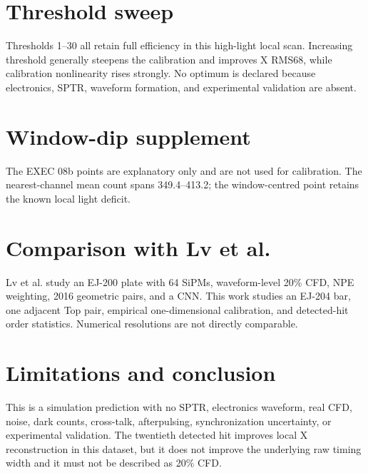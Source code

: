 \documentclass{article}
\begin{document}
\section{Threshold sweep}
Thresholds 1--30 all retain full efficiency in this high-light local scan.
Increasing threshold generally steepens the calibration and improves X RMS68,
while calibration nonlinearity rises strongly. No optimum is declared because
electronics, SPTR, waveform formation, and experimental validation are absent.
\section{Window-dip supplement}
The EXEC 08b points are explanatory only and are not used for calibration.
The nearest-channel mean count spans 349.4--413.2;
the window-centred point retains the known local light deficit.
\section{Comparison with Lv et al.}
Lv et al. study an EJ-200 plate with 64 SiPMs, waveform-level 20\% CFD, NPE
weighting, 2016 geometric pairs, and a CNN. This work studies an EJ-204 bar,
one adjacent Top pair, empirical one-dimensional calibration, and detected-hit
order statistics. Numerical resolutions are not directly comparable.
\section{Limitations and conclusion}
This is a simulation prediction with no SPTR, electronics waveform, real CFD,
noise, dark counts, cross-talk, afterpulsing, synchronization uncertainty, or
experimental validation. The twentieth detected hit improves local X
reconstruction in this dataset, but it does not improve the underlying raw
timing width and it must not be described as 20\% CFD.
\end{document}
